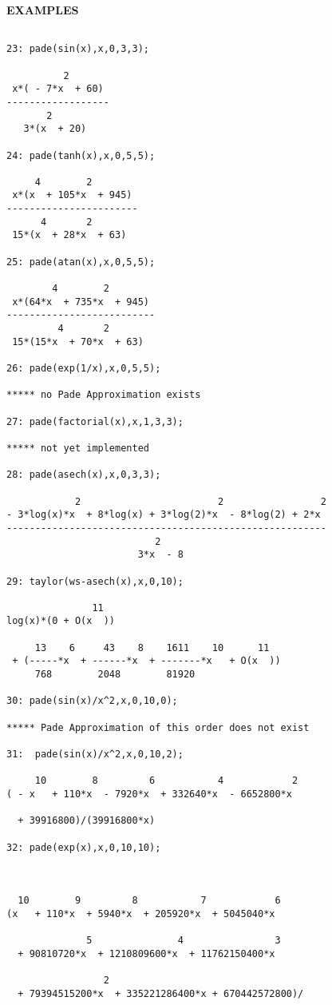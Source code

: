 \large{\textbf{EXAMPLES}}

\begin{verbatim}

23: pade(sin(x),x,0,3,3);

          2
 x*( - 7*x  + 60)
------------------
       2
   3*(x  + 20)

24: pade(tanh(x),x,0,5,5);

     4        2
 x*(x  + 105*x  + 945)
-----------------------
      4       2
 15*(x  + 28*x  + 63)

25: pade(atan(x),x,0,5,5);

        4        2
 x*(64*x  + 735*x  + 945)
--------------------------
         4       2
 15*(15*x  + 70*x  + 63)

26: pade(exp(1/x),x,0,5,5);

***** no Pade Approximation exists

27: pade(factorial(x),x,1,3,3);

***** not yet implemented

28: pade(asech(x),x,0,3,3);

            2                        2                 2
- 3*log(x)*x  + 8*log(x) + 3*log(2)*x  - 8*log(2) + 2*x
--------------------------------------------------------
                          2
                       3*x  - 8

29: taylor(ws-asech(x),x,0,10);

               11  
log(x)*(0 + O(x  ))

     13    6     43    8    1611    10      11
 + (-----*x  + ------*x  + -------*x   + O(x  ))
     768        2048        81920

30: pade(sin(x)/x^2,x,0,10,0);

***** Pade Approximation of this order does not exist

31:  pade(sin(x)/x^2,x,0,10,2);

     10        8         6           4            2
( - x   + 110*x  - 7920*x  + 332640*x  - 6652800*x

  + 39916800)/(39916800*x)

32: pade(exp(x),x,0,10,10);



  10        9         8           7            6
(x   + 110*x  + 5940*x  + 205920*x  + 5045040*x

              5               4                3
  + 90810720*x  + 1210809600*x  + 11762150400*x

                 2
  + 79394515200*x  + 335221286400*x + 670442572800)/


\end{verbatim}
